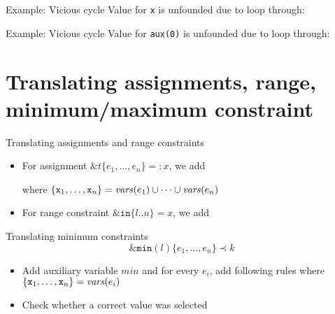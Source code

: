 \documentclass[11pt]{beamer}
\begin{document}
\begin{frame}{Example: Vicious cycle}
  Value for \texttt{x} is unfounded due to loop through:
  \scriptsize
\end{frame}

\begin{frame}{Example: Vicious cycle}
  Value for \texttt{aux(0)} is unfounded due to loop through:
  \small
\end{frame}

\section{Translating assignments, range, minimum/maximum constraint}
\begin{frame}{Translating assignments and range constraints}
 \begin{itemize}
    \item For assignment $\mathtt{\&}t\mathtt{\{}e_1,\dots,e_n\mathtt{\}} =: x$, we add
    \pause
    
    where $\{\mathtt{x}_1,\dots,\mathtt{x}_n\}=\mathit{vars}(e_1)\cup\dots\cup\mathit{vars}(e_n)$
    \pause
    \item For range constraint $\mathtt{\&in}\mathtt{\{}l\mathtt{..}u{\}} = x$, we add
    \pause
    
 \end{itemize}
\end{frame}

\begin{frame}{Translating minimum constraints}
\[\mathtt{\&min}(l)\mathtt{\{}e_1,\dots,e_n\mathtt{\}} \prec k\]
\pause
 \begin{itemize}
    \item Add auxiliary variable $\mathit{min}$ and for every $e_i$, add following rules where $\{\mathtt{x}_1,\dots,\mathtt{x}_n\}=\mathit{vars}(e_i)$ 
    
    \pause
    \item Check whether a correct value was selected
    
   \end{itemize}
\end{frame}
\end{document}

